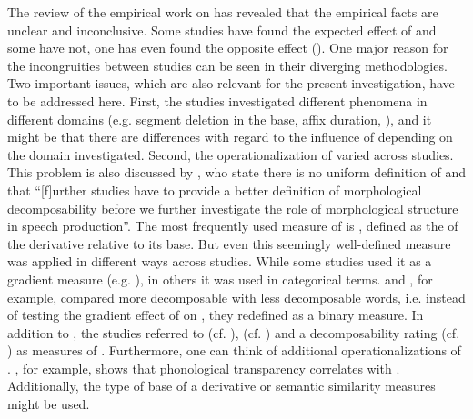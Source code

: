 The review of the empirical work on  has revealed that the empirical facts are unclear and inconclusive. Some studies have found the expected effect of  and some have not, one has even found the opposite effect (\citealt{Schuppler.2012}). 
One major reason for the incongruities between studies can be seen in their diverging methodologies. Two important issues, which are also relevant for the present investigation, have to be addressed  here. 
First, the studies investigated different phenomena in different domains (e.g. segment deletion in the base, affix duration, ), and it might be that there are differences with regard to the influence of  depending on the domain investigated. 
Second, the operationalization of  varied across studies. This problem is also discussed by \citet[16]{Hanique.2012}, who state there is no uniform definition of  and that ``[f]urther studies have to provide a better definition of morphological decomposability before we further investigate the role of morphological structure in speech production''. 
The most frequently used measure of  is , defined as the  of the derivative relative to its base. But even this seemingly well-defined measure was applied in different ways across studies. While some studies used it as a gradient measure (e.g. \citealt{Hanique.2011,Schuppler.2012}), in others it was used in categorical terms. \cite{Hay.2001} and \cite{Collie.2008}, for example, compared more decomposable with less decomposable words, i.e. instead of testing the gradient effect of  on , they redefined  as a binary measure. In addition to ,  the studies referred to  (cf. \citealt{Schuppler.2012}),  (cf. \citealt{Hay.2007}) and a decomposability rating (cf. \citealt{Burki.2011}) as measures of . Furthermore, one can think of additional operationalizations of . \cite{Hay.2003}, for example, shows that phonological transparency correlates with . Additionally, the type of base of a derivative or semantic similarity measures might be used.  

